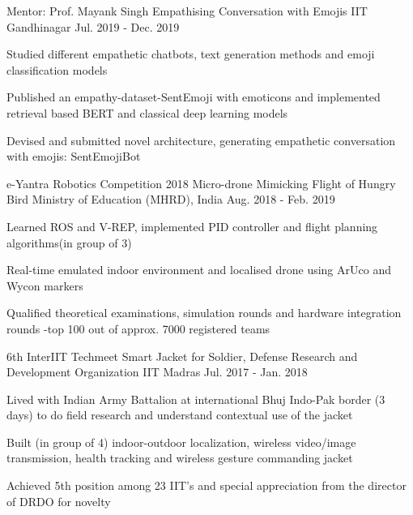 \begin{cventries}
  \cventry
    {Mentor: Prof. Mayank Singh} %
    {Empathising Conversation with Emojis } %
    {IIT Gandhinagar} %
    {Jul. 2019 - Dec. 2019} %
    {
      \begin{cvitems} %
        \item {Studied different empathetic chatbots, text generation methods and emoji classification models} 
        \item {Published an empathy-dataset-SentEmoji with emoticons and implemented retrieval based BERT and classical deep learning models}
        \item {Devised and submitted novel architecture, generating empathetic conversation with emojis: SentEmojiBot} 
      \end{cvitems}
    }

  \cventry
    {e-Yantra Robotics Competition 2018} %
    {Micro-drone Mimicking Flight of Hungry Bird  {}} %
    {Ministry of Education (MHRD), India} %
    {Aug. 2018 - Feb. 2019} %
    {\begin{cvitems}
      \item {Learned ROS and V-REP, implemented PID controller and flight planning algorithms(in group of 3)}
      \item {Real-time emulated indoor environment and localised drone using ArUco and Wycon markers}
    \item {Qualified theoretical examinations, simulation rounds and hardware integration rounds -top 100 out of approx. 7000 registered teams}
     \end{cvitems}
    }

  \cventry
    {6th InterIIT Techmeet} %
    {Smart Jacket for Soldier, Defense Research and Development Organization } %
    {IIT Madras} %
    {Jul. 2017 - Jan. 2018} %
    {
      \begin{cvitems} %
        \item {Lived with Indian Army Battalion at international Bhuj Indo-Pak border (3 days) to do field research and understand contextual use of the jacket}
        \item {Built (in group of 4) indoor-outdoor localization, wireless video/image transmission, health tracking and wireless gesture commanding jacket}
        \item {Achieved 5th position among 23 IIT's and special appreciation from the director of DRDO for novelty}
      \end{cvitems}
    }




\end{cventries}
